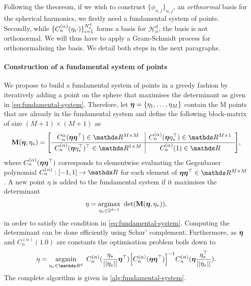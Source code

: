 Following the theoreom, if we wish to construct $\{\phi_{n,j}\}_{n,j}$, an \emph{orthnormal} basis for the spherical harmonics, we firstly need a fundamental system of points. Secondly, while $\{C_n^{(\alpha)}(\eta_i \cdot)\}_{i=1}^{N^d_n}$ forms a basis for $\mathcal{H}_n^d$, the basis is not orthonormal. We will thus have to apply a Gram-Schmidt process for orthonormalising the basis. We detail both steps in the next paragraphs.

\paragraph{Construction of a fundamental system of points}
We propose to build a fundamental system of points in a greedy fashion by iteratively adding a point on the sphere that maximises the determinant as given in \cref{eq:fundamental-system}. Therefore, let $\boldsymbol{\eta} = \{\eta_1, \ldots, \eta_M\}$ contain the M points that are already in the fundamental system and define the following block-matrix of size $(M+1) \times (M+1)$ as
\begin{equation}
    \renewcommand\arraystretch{1.3}
    \MM(\veta, \eta_{*}) =
    \left[
        \begin{array}{c|c}
          C_n^{\alpha}(\veta\veta\transpose) \in \Reals^{M \times M} & C_n^{(\alpha)}(\veta\eta_{*}\transpose) \in \Reals^{M \times 1} \\
          \hline
          C_n^{(\alpha)}(\veta\eta_{*}\transpose)\transpose \in \Reals^{1 \times M} & C_n^{(\alpha)}(1) \in \Reals
        \end{array}
    \right],
\end{equation}
where $C_n^{(\alpha)}(\boldsymbol{\eta}\boldsymbol{\eta}^{\top})$ corresponds to elementwise evaluating the Gegenbauer polynomial $C_n^{(\alpha)}: [-1, 1] \rightarrow \Reals$ for each element of $\veta \veta\transpose \in \Reals^{M \times M}$. A new point $\eta$ is added to the fundamental system if it maximises the determinant
\begin{equation}
    \eta = \argmax_{\eta_* \in \dsphere}\ \textrm{det}\left(\MM(\veta, \eta_{*})\right),
\end{equation}
in order to satisfy the condition in \cref{eq:fundamental-system}.
Computing the determinant can be done efficiently using Schur' complement. Furthermore, as $\boldsymbol{\eta}$ and $C_n^{(\alpha)}(1.0)$ are constants the optimisation problem boils down to
\begin{equation}
    \label{eq:optimisation-determinant}
    \eta = \argmin_{\eta_* \in \Reals^d}\ C_n^{(\alpha)}(\frac{\eta_{*}}{\norm{\eta_*}}\veta\transpose) \left[C_n^{(\alpha)}(\veta\veta\transpose)\right]^{-1} C_n^{(\alpha)}(\veta\frac{\eta_{*}\transpose}{\norm{\eta_*}}).
\end{equation}
The complete algorithm is given in \cref{alg:fundamental-system}.

